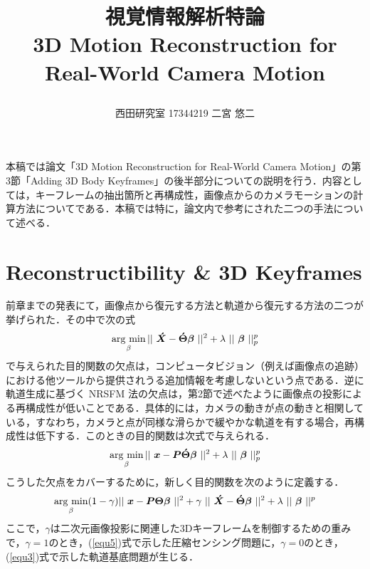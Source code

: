 \documentclass[a4paper,10pt]{jarticle}
\title{\vspace{-20truemm}
{\normalsize \rightline{平成29年\ 6月\ 5日}}  %
{\large 視覚情報解析特論\\} %
3D Motion Reconstruction for Real-World Camera Motion\\ %
\date{}
\vspace{-2truemm}}
\author{西田研究室 17344219 二宮 悠二} %
\newcommand{\argmin}{\mathop{\rm arg~min}\limits} %
\begin{document}
\titlepage
\maketitle

本稿では論文「3D Motion Reconstruction for Real-World Camera Motion」の第3節「Adding 3D Body Keyframes」の後半部分についての説明を行う．内容としては，キーフレームの抽出箇所と再構成性，画像点からのカメラモーションの計算方法についてである．本稿では特に，論文内で参考にされた二つの手法について述べる．




\section{Reconstructibility \& 3D Keyframes}
\label{sec1}
前章までの発表にて，画像点から復元する方法と軌道から復元する方法の二つが挙げられた．その中で次の式
%
\begin{equation}
 \argmin_{\beta} || ~ \mbox{\boldmath $ \acute{X} $} - \mbox{\boldmath $ \acute{\Theta} $} \mbox{\boldmath $ \beta $} ~ ||^2 + \lambda ~ || ~ \mbox{\boldmath $ \beta $} ~ ||^p_p
\label{equ5}
\end{equation}
%
で与えられた目的関数の欠点は，コンピュータビジョン（例えば画像点の追跡）における他ツールから提供されうる追加情報を考慮しないという点である．逆に軌道生成に基づく NRSFM 法の欠点は，第2節で述べたように画像点の投影による再構成性が低いことである．具体的には，カメラの動きが点の動きと相関している，すなわち，カメラと点が同様な滑らかで緩やかな軌道を有する場合，再構成性は低下する．このときの目的関数は次式で与えられる．
%
\begin{equation}
 \argmin_{\beta} || ~ \mbox{\boldmath $x$} - \mbox{\boldmath $P$} \mbox{\boldmath $\acute{\Theta}$} \mbox{\boldmath $\beta$} ~ ||^2 + \lambda ~ || ~ \mbox{\boldmath $\beta$} ~ ||^p_p
\label{equ3}
\end{equation}
%
こうした欠点をカバーするために，新しく目的関数を次のように定義する．
%
\begin{equation}
 \argmin_{\beta} ( 1 - \gamma ) || ~ \mbox{\boldmath $x$} - \mbox{\boldmath $P$} \mbox{\boldmath $\Theta$} \mbox{\boldmath $\beta$} ~ ||^2 + \gamma ~ || ~ \mbox{\boldmath $ \acute{X} $} - \mbox{\boldmath $ \acute{\Theta} $} \mbox{\boldmath $ \beta $} ~ ||^2 + \lambda ~ || ~ \mbox{\boldmath $ \beta $} ~ ||^p
\label{equ6}
\end{equation}
%
ここで，$ \gamma $は二次元画像投影に関連した3Dキーフレームを制御するための重みで，$ \gamma = 1 $のとき，(\ref{equ5})式で示した圧縮センシング問題に，$ \gamma = 0 $のとき，(\ref{equ3})式で示した軌道基底問題が生じる．
\end{document}
